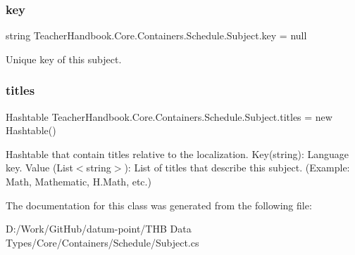 \subsubsection{\texorpdfstring{key}{key}}
{\footnotesize\ttfamily string Teacher\+Handbook.\+Core.\+Containers.\+Schedule.\+Subject.\+key = null}



Unique key of this subject. 

\mbox{\label{class_teacher_handbook_1_1_core_1_1_containers_1_1_schedule_1_1_subject_ac024684f42182cdbcf4ae477395f92a1}} 
\subsubsection{\texorpdfstring{titles}{titles}}
{\footnotesize\ttfamily Hashtable Teacher\+Handbook.\+Core.\+Containers.\+Schedule.\+Subject.\+titles = new Hashtable()}



Hashtable that contain titles relative to the localization. Key(string)\+: Language key. Value (List$<$string$>$)\+: List of titles that describe this subject. (Example\+: Math, Mathematic, H.\+Math, etc.) 



The documentation for this class was generated from the following file\+:\begin{DoxyCompactItemize}
\item 
D\+:/\+Work/\+Git\+Hub/datum-\/point/\+T\+H\+B Data Types/\+Core/\+Containers/\+Schedule/Subject.\+cs\end{DoxyCompactItemize}
